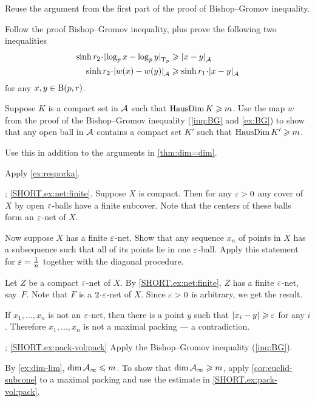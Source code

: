  
Reuse the argument from  the first part of the proof of Bishop--Gromov inequality.

Follow the proof Bishop--Gromov inequality, plus prove the following two inequalities
\begin{align*}
\sinh r_2\cdot \dist{\log_p x}{\log_p y}{\T_p} &\ge\dist{x}{y}{\spc{A}}
\\
\sinh r_2\cdot\dist{w(x)}{w(y)}{\spc{A}} &\ge \sinh r_1\cdot\dist{x}{y}{\spc{A}}
\end{align*}
for any $x,y\in\mathrm{B}{}(p,r)$.

Suppose $K$ is a compact set in $\mathcal{A}$ such that $\mathop{\rm HausDim}\nolimits K\geqslant m$.
Use the map $w$ from the proof of the Bishop--Gromov inequality (\ref{inq:BG} and \ref{ex:BG}) to show that any open ball in $\mathcal{A}$ contains a compact set $K'$ such that $\mathop{\rm HausDim}\nolimits K'\geqslant m$.

Use this in addition to the arguments in \ref{thm:dim=dim}. 

Apply \ref{ex:resporka}.

\parbf{\ref{ex:net}};
\ref{SHORT.ex:net:finite}.
Suppose $X$ is compact.
Then for any $\varepsilon>0$ any cover of $X$ by open $\varepsilon$-balls have a finite subcover.
Note that the centers of these balls form an $\varepsilon$-net of $X$.

Now suppose $X$ has a finite $\varepsilon$-net.
Show that any sequence $x_n$ of points in $X$ has a subsequence such that all of its points lie in one $\varepsilon$-ball.
Apply this statement for $\varepsilon=\tfrac1n$ together with the diagonal procedure.

Let $Z$ be a compact $\varepsilon$-net of $X$.
By \ref{SHORT.ex:net:finite}, $Z$ has a finite $\varepsilon$-net, say~$F$.
Note that $F$ is a $2\cdot\eps$-net of $X$.
Since $\varepsilon>0$ is arbitrary, we get the result.


 If $x_1,\dots,x_n$ is not an $\varepsilon$-net, then there is a point $y$ such that $|{x_i}-{y}|_{}^{{}}\geqslant\varepsilon$ for any $i$.
Therefore $x_1,\dots,x_n$ is not a maximal packing --- a contradiction.

\parbf{\ref{ex:pack-vol}}; \ref{SHORT.ex:pack-vol:pack}
Apply the Bishop--Gromov inequality (\ref{inq:BG}).

\parit{\ref{SHORT.ex:pack-vol:dim}}
By \ref{ex:dim-lim}, $\operatorname{\rm dim}\nolimits\mathcal{A}_\infty\leqslant m$.
To show that $\operatorname{\rm dim}\nolimits\mathcal{A}_\infty\geqslant m$,
apply \ref{cor:euclid-subcone} to a maximal packing and use the estimate in \ref{SHORT.ex:pack-vol:pack}.

